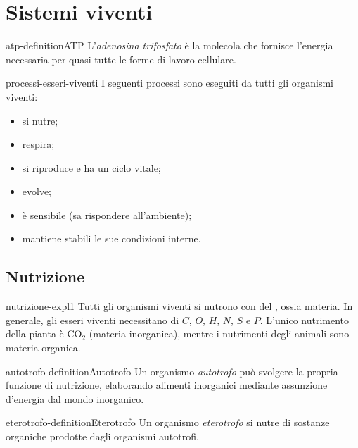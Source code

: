 \documentclass[preview]{standalone}
\begin{document}
\genpage

\section{Sistemi viventi}

\begin{snippetdefinition}{atp-definition}{ATP}
    L'\textit{adenosina trifosfato} è la molecola che fornisce l'energia necessaria per quasi tutte le forme
    di lavoro cellulare.
\end{snippetdefinition}

\begin{snippet}{processi-esseri-viventi}
    I seguenti processi sono eseguiti da tutti gli organismi viventi:
    \begin{itemize}
        \item si nutre;
        \item respira;
        \item si riproduce e ha un ciclo vitale;
        \item evolve;
        \item è sensibile (sa rispondere all'ambiente);
        \item mantiene stabili le sue condizioni interne.
    \end{itemize}
\end{snippet}

\subsection{Nutrizione}

\begin{snippet}{nutrizione-expl1}
Tutti gli organismi viventi si nutrono con del , ossia materia.
In generale, gli esseri viventi necessitano di \(C\), \(O\), \(H\), \(N\), \(S\) e \(P\).
L'unico nutrimento della pianta è CO\({}_2\) (materia inorganica), mentre
i nutrimenti degli animali sono materia organica.
\end{snippet}

\begin{snippetdefinition}{autotrofo-definition}{Autotrofo}
    Un organismo \textit{autotrofo} può svolgere la propria funzione di nutrizione,
    elaborando alimenti inorganici mediante assunzione d'energia dal mondo inorganico.
\end{snippetdefinition}

\begin{snippetdefinition}{eterotrofo-definition}{Eterotrofo}
    Un organismo \textit{eterotrofo}
    si nutre di sostanze organiche prodotte dagli organismi autotrofi.
\end{snippetdefinition}
\end{document}
